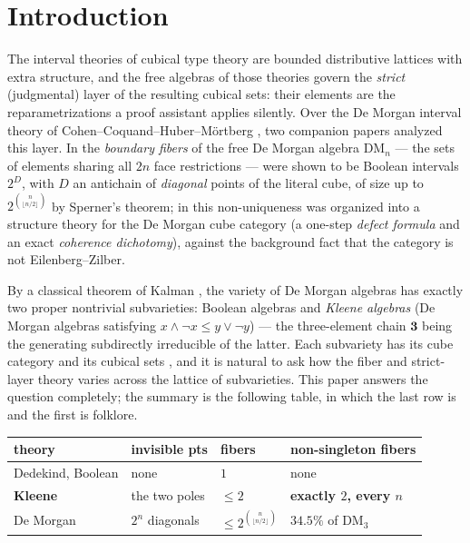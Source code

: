 \documentclass[11pt]{amsart}
\theoremstyle{definition}
\newcommand{\DM}{\mathrm{DM}}
\newcommand{\Kthree}{\mathbf{3}}
\begin{document}
\maketitle

\section{Introduction}
\label{sec:intro}

The interval theories of cubical type theory are bounded
distributive lattices with extra structure, and the free algebras of
those theories govern the \emph{strict} (judgmental) layer of the
resulting cubical sets: their elements are the reparametrizations a
proof assistant applies silently.  Over the De Morgan interval
theory of Cohen--Coquand--Huber--M\"ortberg \cite{CCHM}, two
companion papers analyzed this layer.  In \cite{DMFibers} the
\emph{boundary fibers} of the free De Morgan algebra $\DM_n$ ---
the sets of elements sharing all $2n$ face restrictions --- were
shown to be Boolean intervals $2^{D}$, with $D$ an antichain of
\emph{diagonal} points of the literal cube, of size up to
$2^{\binom{n}{\lfloor n/2 \rfloor}}$ by Sperner's theorem; in
\cite{StrictDM} this non-uniqueness was organized into a structure
theory for the De Morgan cube category (a one-step \emph{defect
formula} and an exact \emph{coherence dichotomy}), against the
background fact that the category is not Eilenberg--Zilber.

By a classical theorem of Kalman \cite{Kalman}, the variety of De
Morgan algebras has exactly two proper nontrivial subvarieties:
Boolean algebras and \emph{Kleene algebras} (De Morgan algebras
satisfying $x \wedge \neg x \leq y \vee \neg y$) --- the three-element
chain $\Kthree$ being the generating subdirectly irreducible of the
latter.  Each subvariety has its cube category and its cubical sets
\cite{BuchholtzMorehouse}, and it is natural to ask how the fiber
and strict-layer theory varies across the lattice of subvarieties.
This paper answers the question completely; the summary is the
following table, in which the last row is \cite{DMFibers,StrictDM}
and the first is folklore.

\begin{center}
\small
\begin{tabular}{l|l|l|l}
  theory & invisible pts & fibers &
  non-singleton fibers\\
  \hline
  Dedekind, Boolean & none & $1$ & none\\
  \textbf{Kleene} & the two poles & $\leq 2$ &
  \textbf{exactly $2$, every $n$}\\
  De Morgan & $2^n$ diagonals & $\leq 2^{\binom{n}{\lfloor
  n/2\rfloor}}$ & $34.5\%$ of $\DM_3$
\end{tabular}
\end{center}
\end{document}
